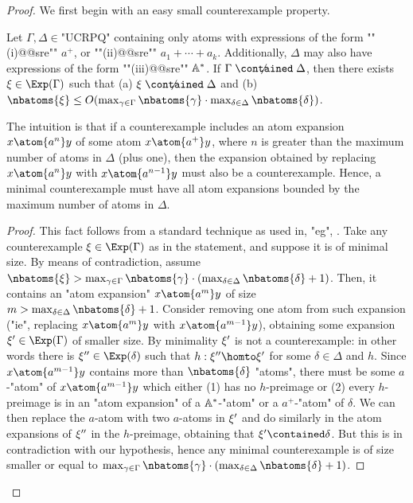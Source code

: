 \begin{proof}
	We first begin with an easy small counterexample property.
	\begin{claim}
		\AP\label{cl:small-counterexample-SRE}
		Let $\Gamma, \Delta \in \text{"UCRPQ"}$ containing only atoms with expressions of the form \AP""(i)@@sre"" $a^+$, or ""(ii)@@sre"" $a_1 + \dotsb + a_k$. Additionally, $\Delta$ may also have expressions of the form ""(iii)@@sre"" $\mathbb{A}^*$. If $\Gamma \centernot{\contained} \Delta$, then there exists $\anexpansion \in \Exp(\Gamma)$ such that (a) $\anexpansion \centernot{\contained} \Delta$ and (b) $\nbatoms{\anexpansion} \leq O(\max_{\gamma \in \Gamma}\nbatoms{\gamma} \cdot \max_{\delta \in \Delta}\nbatoms{\delta})$.
	\end{claim}

	The intuition is that if a counterexample includes an atom expansion $x \atom{a^n} y$ of some atom $x \atom{a^+} y$, where $n$ is greater than the maximum number of atoms in $\Delta$ (plus one), then the expansion obtained by replacing $x \atom{a^n} y$ with $x \atom{a^{n-1}} y$ must also be a counterexample. Hence, a minimal counterexample must have all atom expansions bounded by the maximum number of atoms in $\Delta$.

	\begin{proof}
		This fact follows from a standard technique as used in, "eg", \cite{FigueiraGKMNT20}.
		Take any counterexample $\anexpansion \in \Exp(\Gamma)$ as in the statement, and suppose it is of minimal size. By means of contradiction, assume $\nbatoms{\anexpansion} > \max_{\gamma \in \Gamma}\nbatoms{\gamma} \cdot (\max_{\delta \in \Delta}\nbatoms{\delta}+1)$. 
		Then, it contains an "atom expansion" $x \atom{a^m} y$ of size $m>\max_{\delta \in \Delta}\nbatoms{\delta}+1$. 
		Consider removing one atom from such expansion ("ie", replacing $x \atom{a^m} y$ with $x \atom{a^{m-1}} y$), obtaining some expansion $\anexpansion' \in \Exp(\Gamma)$ of smaller size. By minimality $\xi'$ is not a counterexample: in other words there is  $\anexpansion'' \in \Exp(\delta)$ such that $h:\anexpansion'' \homto \anexpansion'$ for some $\delta \in \Delta$ and $h$. Since $x \atom{a^{m-1}} y$ contains more than $\nbatoms{\delta}$ "atoms", there must be some $a$-"atom" of $x \atom{a^{m-1}} y$ which either (1) has no $h$-preimage or (2) every $h$-preimage is in an "atom expansion" of a $\mathbb{A}^*$-"atom" or a $a^+$-"atom" of $\delta$. We can then replace the $a$-atom with two $a$-atoms in $\xi'$ and do similarly in the atom expansions of $\xi''$ in the $h$-preimage, obtaining that $\anexpansion' \contained \delta$. But this is in contradiction with our hypothesis, hence any minimal counterexample is of size smaller or equal to $\max_{\gamma \in \Gamma}\nbatoms{\gamma} \cdot (\max_{\delta \in \Delta}\nbatoms{\delta}+1)$.
	\end{proof}
	

\end{proof}
